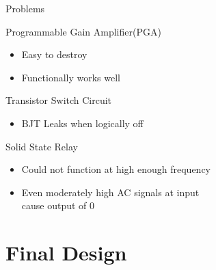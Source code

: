 \begin{frame}{Problems}
  \begin{block}{Programmable Gain Amplifier(PGA)}
  \begin{itemize}
    \item Easy to destroy
    \item Functionally works well
  \end{itemize}
  \end{block}

  \begin{block}{Transistor Switch Circuit}
  \begin{itemize}
    \item BJT Leaks when logically off
  \end{itemize}
  \end{block}

  \begin{block}{Solid State Relay}
  \begin{itemize}
    \item Could not function at high enough frequency
    \item Even moderately high AC signals at input\\ cause output of 0
  \end{itemize}
  \end{block}
\end{frame}


\section{Final Design}

